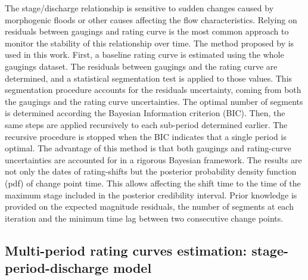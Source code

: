 \documentclass[11pt]{article}
\begin{document}
    The stage/discharge relationship is sensitive to sudden changes caused by morphogenic floods or other causes affecting the flow characteristics. Relying on residuals between gaugings and rating curve is the most common approach to monitor the stability of this relationship over time. The method proposed by \citet{darienzo_detection_2021} is used in this work. First, a baseline rating curve is estimated using the whole gaugings dataset. The residuals between gaugings and the rating curve are determined, and a statistical segmentation test is applied to those values. This segmentation procedure accounts for the residuals uncertainty, coming from both the gaugings and the rating curve uncertainties. The optimal number of segments is determined according the Bayesian Information criterion (BIC). Then, the same steps are applied recursively to each sub-period determined earlier. The recursive procedure is stopped when the BIC indicates that a single period is optimal. The advantage of this method is that both gaugings and rating-curve uncertainties are accounted for in a rigorous Bayesian framework. The results are not only the dates of rating-shifts but the posterior probability density function (pdf) of change point time. This allows affecting the shift time to the time of the maximum stage included in the posterior credibility interval. Prior knowledge is provided on the expected magnitude residuals, the number of segments at each iteration and the minimum time lag between two consecutive change points.
    
    \subsection{Multi-period rating curves estimation: stage-period-discharge model}
    
\end{document}
